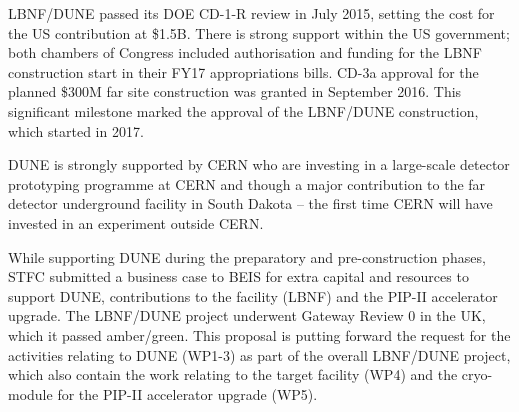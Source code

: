 LBNF/DUNE passed its DOE CD-1-R review in July 2015, setting the cost for the US contribution at \$1.5B. There is strong support within the US government; both chambers of Congress included authorisation and funding for the LBNF construction start in their FY17 appropriations bills. CD-3a approval for the planned \$300M far site construction was granted in September 2016. This significant milestone marked the approval of the LBNF/DUNE construction, which started in 2017. 

DUNE is strongly supported by CERN who are investing in a large-scale detector prototyping programme at CERN and though a major contribution to the far detector underground facility in South Dakota -- the first time CERN will have invested in an experiment outside CERN. 

While supporting DUNE during the preparatory and pre-construction phases, STFC submitted a business case to BEIS for extra capital and resources to support DUNE, contributions to the facility (LBNF) and the PIP-II accelerator upgrade. The LBNF/DUNE project underwent Gateway Review 0 in the UK, which it passed amber/green. This proposal is putting forward the request for the activities relating to DUNE (WP1-3) as part of the overall LBNF/DUNE project, which also contain the work relating to the target facility (WP4) and the cryo-module for the PIP-II accelerator upgrade (WP5). 